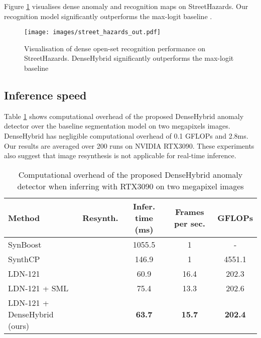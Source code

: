 \documentclass[runningheads]{llncs}
\newcommand{\cmark}{\ding{51}}
\newcommand{\xmark}{\ding{55}}
\begin{document}
Figure \ref{fig:sh_results} visualises dense anomaly and recognition maps on StreetHazards.
Our recognition model significantly outperforms the max-logit baseline \cite{hendrycks19arxiv}.

\begin{figure}
    \centering
    \texttt{[image: images/street\_hazards\_out.pdf]}
    \caption{Visualisation of dense open-set recognition performance on StreetHazards.
    DenseHybrid significantly outperforms the max-logit baseline \cite{hendrycks19arxiv}}
    \label{fig:sh_results}
\end{figure}

\subsection{Inference speed}
Table \ref{tbl:speed} shows computational overhead of the proposed DenseHybrid anomaly detector over the baseline segmentation model on two megapixels images.
DenseHybrid has negligible computational overhead of 0.1 GFLOPs and 2.8ms.
Our results are averaged 
over 200 runs on NVIDIA RTX3090.
These experiments also suggest that 
image resynthesis is not applicable 
for real-time inference.
\begin{table}[h]
\begin{center}
\caption{Computational overhead of the proposed DenseHybrid anomaly detector when inferring with RTX3090 on two megapixel images
}
\label{tbl:speed}
\begin{tabular}{lcccc}
\hline \hline
Method & \multicolumn{1}{c|}{Resynth.} & \multicolumn{1}{c|}{Infer. time (ms)} & \multicolumn{1}{c|}{Frames per sec.} & GFLOPs \\\hline \hline
SynBoost \cite{biase21cvpr} & \cmark & 1055.5 & 1 & - \\
SynthCP \cite{xia20eccv} & \cmark & 146.9 & 1 & 4551.1 \\
LDN-121 \cite{kreso21tits} & \xmark & 60.9 & 16.4 & 202.3 \\ 
LDN-121 + SML \cite{jung21iccv} & \xmark & 75.4 & 13.3 & 202.6\\
LDN-121 + DenseHybrid (ours) & \xmark & \textbf{63.7}  & \textbf{15.7} & \textbf{202.4} \\\hline
\end{tabular}
\end{center}
\end{table}
\end{document}
